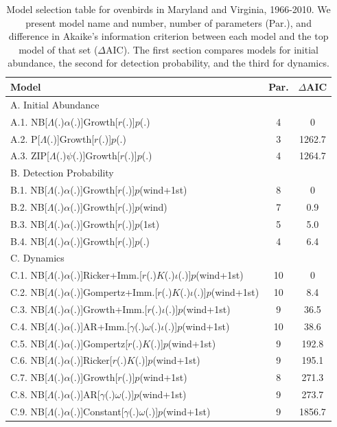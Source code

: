 \documentclass[12pt]{article}
\begin{document}
\begin{table}
  \centering
  \small
  \caption{Model selection table for ovenbirds in Maryland and Virginia, 
    1966-2010.  We present model name
    and number, number of parameters (Par.), and difference in Akaike's
    information criterion between each model and the top model of that
    set ($\Delta$AIC).  The first section compares
    models for initial abundance, the second for detection probability,
    and the third for dynamics.}
  \begin{tabular}[h]{lcc}
\hline
Model	&Par.	&$\Delta$AIC	\\
\hline
A. Initial Abundance && \\
A.1. NB[$\Lambda$(.)$\alpha$(.)]Growth[$r$(.)]$p$(.)	&4	&0\\
A.2. P[$\Lambda$(.)]Growth[$r$(.)]$p$(.)	&3	&1262.7\\
A.3. ZIP[$\Lambda$(.)$\psi$(.)]Growth[$r$(.)]$p$(.)	&4 &1264.7\\
\hline
B. Detection Probability && \\
B.1. NB[$\Lambda$(.)$\alpha$(.)]Growth[$r$(.)]$p$(wind+1st)	&8
&0	\\
B.2. NB[$\Lambda$(.)$\alpha$(.)]Growth[$r$(.)]$p$(wind)	&7	&0.9\\
B.3. NB[$\Lambda$(.)$\alpha$(.)]Growth[$r$(.)]$p$(1st)	&5	&5.0\\
B.4. NB[$\Lambda$(.)$\alpha$(.)]Growth[$r$(.)]$p$(.)	&4	&6.4\\
\hline
C. Dynamics && \\
C.1. NB[$\Lambda$(.)$\alpha$(.)]Ricker+Imm.[$r$(.)$K$(.)$\iota$(.)]$p$(wind+1st)
&10	&0	\\
C.2. NB[$\Lambda$(.)$\alpha$(.)]Gompertz+Imm.[$r$(.)$K$(.)$\iota$(.)]$p$(wind+1st)
&10	&8.4 \\
C.3. NB[$\Lambda$(.)$\alpha$(.)]Growth+Imm.[$r$(.)$\iota$(.)]$p$(wind+1st)
&9	&36.5\\
C.4. NB[$\Lambda$(.)$\alpha$(.)]AR+Imm.[$\gamma$(.)$\omega$(.)$\iota$(.)]$p$(wind+1st)
&10	&38.6\\
C.5. NB[$\Lambda$(.)$\alpha$(.)]Gompertz[$r$(.)$K$(.)]$p$(wind+1st)
&9	&192.8\\
C.6. NB[$\Lambda$(.)$\alpha$(.)]Ricker[$r$(.)$K$(.)]$p$(wind+1st)
&9	&195.1\\
C.7. NB[$\Lambda$(.)$\alpha$(.)]Growth[$r$(.)]$p$(wind+1st)	&8
&271.3\\
C.8. NB[$\Lambda$(.)$\alpha$(.)]AR[$\gamma$(.)$\omega$(.)]$p$(wind+1st)
&9	&273.7\\
C.9. NB[$\Lambda$(.)$\alpha$(.)]Constant[$\gamma$(.)$\omega$(.)]$p$(wind+1st)
&9	&1856.7\\
\hline
\end{tabular}
\end{table}
\end{document}
